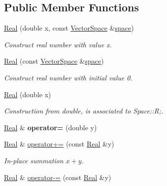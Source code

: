 \subsection*{\-Public \-Member \-Functions}
\begin{DoxyCompactItemize}
\item 
\hyperlink{classSpacy_1_1Real_a7c8581cf79ac0d3ffdc31179d31d8e30}{\-Real} (double x, const \hyperlink{classSpacy_1_1VectorSpace}{\-Vector\-Space} \&\hyperlink{classSpacy_1_1VectorBase_aa999dbf9d679d895dfe04c10fbf9f5e9}{space})
\begin{DoxyCompactList}\small\item\em \-Construct real number with value x. \end{DoxyCompactList}\item 
\hyperlink{classSpacy_1_1Real_a5ae2b93ceddb594b142b3706e4cc9c83}{\-Real} (const \hyperlink{classSpacy_1_1VectorSpace}{\-Vector\-Space} \&\hyperlink{classSpacy_1_1VectorBase_aa999dbf9d679d895dfe04c10fbf9f5e9}{space})
\begin{DoxyCompactList}\small\item\em \-Construct real number with initial value 0. \end{DoxyCompactList}\item 
\hypertarget{classSpacy_1_1Real_ad0f157978475b3c9942a1bcdceb41ab0}{\hyperlink{classSpacy_1_1Real_ad0f157978475b3c9942a1bcdceb41ab0}{\-Real} (double x)}\label{classSpacy_1_1Real_ad0f157978475b3c9942a1bcdceb41ab0}

\begin{DoxyCompactList}\small\item\em \-Construction from double, is associated to \-Space\-::\-R;. \end{DoxyCompactList}\item 
\hypertarget{classSpacy_1_1Real_a2c90e84d6c6732b6812d371b7ccf3a18}{\hyperlink{classSpacy_1_1Real}{\-Real} \& {\bfseries operator=} (double y)}\label{classSpacy_1_1Real_a2c90e84d6c6732b6812d371b7ccf3a18}

\item 
\hypertarget{classSpacy_1_1Real_afe343ccee93f82b75d214c389baee9be}{\hyperlink{classSpacy_1_1Real}{\-Real} \& \hyperlink{classSpacy_1_1Real_afe343ccee93f82b75d214c389baee9be}{operator+=} (const \hyperlink{classSpacy_1_1Real}{\-Real} \&y)}\label{classSpacy_1_1Real_afe343ccee93f82b75d214c389baee9be}

\begin{DoxyCompactList}\small\item\em \-In-\/place summation $x+y$. \end{DoxyCompactList}\item 
\hypertarget{classSpacy_1_1Real_a6af6b5e8aeeaa16be7acc6cdb6b0a9a4}{\hyperlink{classSpacy_1_1Real}{\-Real} \& \hyperlink{classSpacy_1_1Real_a6af6b5e8aeeaa16be7acc6cdb6b0a9a4}{operator-\/=} (const \hyperlink{classSpacy_1_1Real}{\-Real} \&y)}\label{classSpacy_1_1Real_a6af6b5e8aeeaa16be7acc6cdb6b0a9a4}


\end{DoxyCompactItemize}
